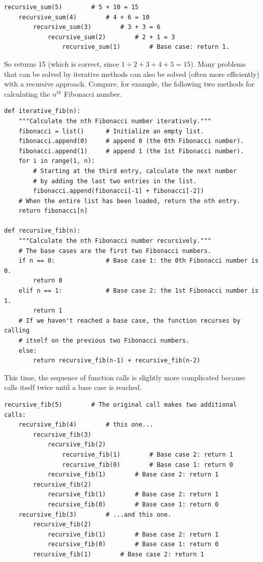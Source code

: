 \begin{lstlisting}
recursive_sum(5)		# 5 + 10 = 15
	recursive_sum(4)		# 4 + 6 = 10
		recursive_sum(3)		# 3 + 3 = 6
			recursive_sum(2)		# 2 + 1 = 3
				recursive_sum(1)		# Base case: return 1.
\end{lstlisting}

So  returns 15 (which is correct, since $1 + 2 + 3 + 4 + 5 = 15$).
Many problems that can be solved by iterative methods can also be solved (often more efficiently) with a recursive approach.
Compare, for example, the following two methods for calculating the $n^{th}$ Fibonacci number.

\begin{lstlisting}
def iterative_fib(n):
	"""Calculate the nth Fibonacci number iteratively."""
	fibonacci = list()		# Initialize an empty list.
	fibonacci.append(0)		# append 0 (the 0th Fibonacci number).
	fibonacci.append(1)		# append 1 (the 1st Fibonacci number).
	for i in range(1, n):
		# Starting at the third entry, calculate the next number
		# by adding the last two entries in the list.
		fibonacci.append(fibonacci[-1] + fibonacci[-2])
	# When the entire list has been loaded, return the nth entry.
	return fibonacci[n]

def recursive_fib(n):
	"""Calculate the nth Fibonacci number recursively."""
	# The base cases are the first two Fibonacci numbers.
	if n == 0:				# Base case 1: the 0th Fibonacci number is 0.
		return 0
	elif n == 1:			# Base case 2: the 1st Fibonacci number is 1.
		return 1
	# If we haven't reached a base case, the function recurses by calling
	# itself on the previous two Fibonacci numbers.
	else:
		return recursive_fib(n-1) + recursive_fib(n-2)
\end{lstlisting}

This time, the sequence of function calls is slightly more complicated because  calls itself twice until a base case is reached.

\begin{lstlisting}
recursive_fib(5)		# The original call makes two additional calls:
	recursive_fib(4)		# this one...
		recursive_fib(3)
			recursive_fib(2)
				recursive_fib(1)		# Base case 2: return 1
				recursive_fib(0)		# Base case 1: return 0
			recursive_fib(1)		# Base case 2: return 1
		recursive_fib(2)
			recursive_fib(1)		# Base case 2: return 1
			recursive_fib(0)		# Base case 1: return 0
	recursive_fib(3)		# ...and this one.
		recursive_fib(2)
			recursive_fib(1)		# Base case 2: return 1
			recursive_fib(0)		# Base case 1: return 0
		recursive_fib(1)		# Base case 2: return 1
\end{lstlisting}

